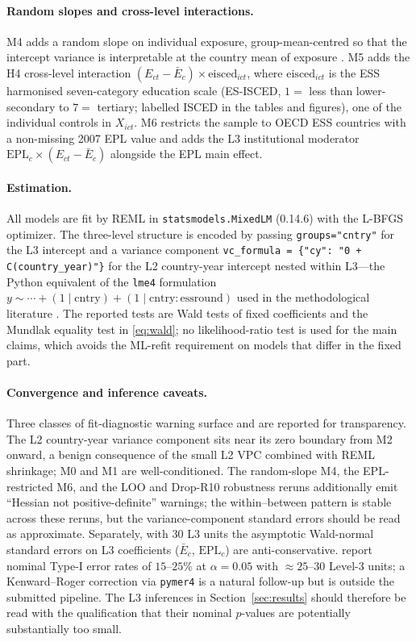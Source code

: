 \paragraph{Random slopes and cross-level interactions.}
M4 adds a random slope on individual exposure, group-mean-centred so
that the intercept variance is interpretable at the country mean of
exposure \citep{EndersTofighi2007}. M5 adds the H4 cross-level
interaction $(E_{ct}-\bar E_c)\times \mathrm{eisced}_{ict}$, where
$\mathrm{eisced}_{ict}$ is the ESS harmonised seven-category education
scale (ES-ISCED, $1=$ less than lower-secondary to $7=$ tertiary;
labelled ISCED in the tables and figures), one of the individual
controls in $X_{ict}$. M6
restricts the sample to OECD ESS countries with a non-missing 2007 EPL
value and adds the L3 institutional moderator
$\mathrm{EPL}_c \times (E_{ct}-\bar E_c)$ alongside the EPL main effect.

\paragraph{Estimation.}
All models are fit by REML in \texttt{statsmodels.MixedLM} (0.14.6)
with the L-BFGS optimizer. The three-level structure is encoded by
passing \texttt{groups="cntry"} for the L3 intercept and a variance
component \texttt{vc\_formula = \{"cy": "0 + C(country\_year)"\}} for
the L2 country-year intercept nested within L3---the Python equivalent
of the \texttt{lme4} formulation
$y \sim \cdots + (1\mid\mathrm{cntry}) + (1\mid\mathrm{cntry}{:}\mathrm{essround})$
used in the methodological literature
\citep{BellJones2015,SchmidtCatranFairbrother2016,Bates2014}. The
reported tests are Wald tests of fixed coefficients and the Mundlak
equality test in \eqref{eq:wald}; no likelihood-ratio test is used for
the main claims, which avoids the ML-refit requirement on models that
differ in the fixed part.

\paragraph{Convergence and inference caveats.}
Three classes of fit-diagnostic warning surface and are reported for
transparency. The L2 country-year variance component sits near its
zero boundary from M2 onward, a benign consequence of the small L2 VPC
combined with REML shrinkage; M0 and M1 are well-conditioned. The
random-slope M4, the EPL-restricted M6, and the LOO and Drop-R10
robustness reruns additionally emit ``Hessian not positive-definite''
warnings; the within--between pattern is stable across these reruns,
but the variance-component standard errors should be read as
approximate. Separately, with 30 L3 units the asymptotic Wald-normal
standard errors on L3 coefficients ($\bar E_c$, $\mathrm{EPL}_c$) are
anti-conservative. \citet{McNeishStapleton2016} report nominal Type-I
error rates of $15$--$25\%$ at $\alpha=0.05$ with
$\approx 25$--$30$ Level-3 units; a Kenward--Roger correction via
\texttt{pymer4} is a natural follow-up but is outside
the submitted pipeline. The L3 inferences in Section~\ref{sec:results}
should therefore be read with the qualification that their nominal
$p$-values are potentially substantially too small.
